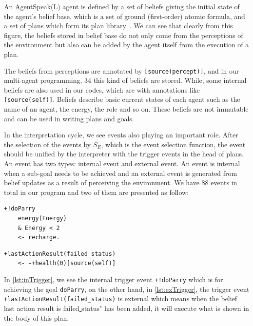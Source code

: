 An AgentSpeak(L) agent is defined by a set of beliefs giving the initial state of the agent's belief base, which is a set of ground (first-order) atomic formula, and a set of plans which form its plan library~\cite{rafael_BDIAgent_2005}. We can see that clearly from this figure, the beliefs stored in belief base do not only come from the perceptions of the environment but also can be added by the agent itself from the execution of a plan.

The beliefs from perceptions are annotated by \texttt{[source(percept)]}, and in our multi-agent programming, 34 this kind of beliefs are stored. While, some internal beliefs are also used in our codes, which are with annotations like \texttt{[source(self)]}. Beliefs describe basic current states of each agent such as the name of an agent, the energy, the role and so on. These beliefs are not immutable and can be used in writing plans and goals.

In the interpretation cycle, we see events also playing an important role. After the selection of the events by $S_E$, which is the event selection function, the event should be unified by the interpreter with the trigger events in the head of plans. An event has two types: internal event and external event. An event is internal when a sub-goal needs to be achieved and an external event is generated from belief updates as a result of perceiving the environment. We have 88 events in total in our program and two of them are presented as follow:

\begin{lstlisting}[caption={Internal Trigger Event.},label={lst:inTrigger}]
  +!doParry
    energy(Energy)
    & Energy < 2
    <- recharge.
\end{lstlisting}

\begin{lstlisting}[caption={External Trigger Event.},label={lst:exTrigger}]
  +lastActionResult(failed_status)
    <- -+health(0)[source(self)]
\end{lstlisting}

In \autoref{lst:inTrigger}, we see the internal trigger event \texttt{+!doParry} which is for achieving the goal \texttt{doParry}, on the other hand, in \autoref{lst:exTrigger}, the trigger event \texttt{+lastActionResult(failed\_status)} is external which means when the belief last action result is failed\underline{ }status" has been added, it will execute what is shown in the body of this plan.


